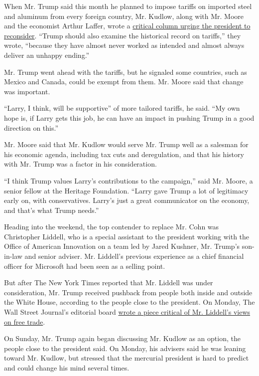 When Mr. Trump said this month he planned to impose tariffs on imported
steel and aluminum from every foreign country, Mr. Kudlow, along with
Mr. Moore and the economist Arthur Laffer, wrote a
\href{https://www.cnbc.com/2018/03/03/kudlow-mr-president-tariffs-are-really-tax-hikes.html}{critical
column urging the president to reconsider}. ``Trump should also examine
the historical record on tariffs,'' they wrote, ``because they have
almost never worked as intended and almost always deliver an unhappy
ending.''

Mr. Trump went ahead with the tariffs, but he signaled some countries,
such as Mexico and Canada, could be exempt from them. Mr. Moore said
that change was important.

``Larry, I think, will be supportive'' of more tailored tariffs, he
said. ``My own hope is, if Larry gets this job, he can have an impact in
pushing Trump in a good direction on this.''

Mr. Moore said that Mr. Kudlow would serve Mr. Trump well as a salesman
for his economic agenda, including tax cuts and deregulation, and that
his history with Mr. Trump was a factor in his consideration.

``I think Trump values Larry's contributions to the campaign,'' said Mr.
Moore, a senior fellow at the Heritage Foundation. ``Larry gave Trump a
lot of legitimacy early on, with conservatives. Larry's just a great
communicator on the economy, and that's what Trump needs.''

Heading into the weekend, the top contender to replace Mr. Cohn was
Christopher Liddell, who is a special assistant to the president working
with the Office of American Innovation on a team led by Jared Kushner,
Mr. Trump's son-in-law and senior adviser. Mr. Liddell's previous
experience as a chief financial officer for Microsoft had been seen as a
selling point.

But after The New York Times reported that Mr. Liddell was under
consideration, Mr. Trump received pushback from people both inside and
outside the White House, according to the people close to the president.
On Monday, The Wall Street Journal's editorial board
\href{https://www.wsj.com/articles/a-not-so-liddell-problem-1520802951}{wrote
a piece critical of Mr. Liddell's views on free trade}.

On Sunday, Mr. Trump again began discussing Mr. Kudlow as an option, the
people close to the president said. On Monday, his advisers said he was
leaning toward Mr. Kudlow, but stressed that the mercurial president is
hard to predict and could change his mind several times.

